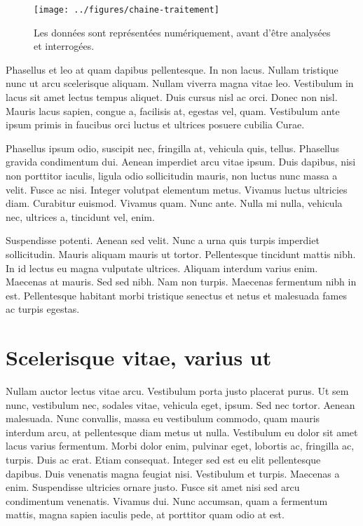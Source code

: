 \documentclass[../hdr.tex]{subfiles}
\begin{document}
\begin{figure}[htp]
  \centering
\texttt{[image: ../figures/chaine-traitement]}
  \caption[Les données sont représentées numériquement, avant d'être analysées
  et interrogées]{Les données sont représentées numériquement, avant d'être analysées
  et interrogées\footnotemark.}
  \label{chaine-traitement1}
\end{figure}


Phasellus et leo at quam dapibus pellentesque. In non lacus. Nullam tristique
nunc ut arcu scelerisque aliquam. Nullam viverra magna vitae leo. Vestibulum in
lacus sit amet lectus tempus aliquet. Duis cursus nisl ac orci. Donec non nisl.
Mauris lacus sapien, congue a, facilisis at, egestas vel, quam. Vestibulum ante
ipsum primis in faucibus orci luctus et ultrices posuere cubilia Curae.

Phasellus ipsum odio, suscipit nec, fringilla at, vehicula quis, tellus.
Phasellus gravida condimentum dui. Aenean imperdiet arcu vitae ipsum. Duis
dapibus, nisi non porttitor iaculis, ligula odio sollicitudin mauris, non luctus
nunc massa a velit. Fusce ac nisi. Integer volutpat elementum metus. Vivamus
luctus ultricies diam. Curabitur euismod. Vivamus quam. Nunc ante. Nulla mi
nulla, vehicula nec, ultrices a, tincidunt vel, enim.

Suspendisse potenti. Aenean sed velit. Nunc a urna quis turpis imperdiet
sollicitudin. Mauris aliquam mauris ut tortor. Pellentesque tincidunt mattis
nibh. In id lectus eu magna vulputate ultrices. Aliquam interdum varius enim.
Maecenas at mauris. Sed sed nibh. Nam non turpis. Maecenas fermentum nibh in
est. Pellentesque habitant morbi tristique senectus et netus et malesuada fames
ac turpis egestas.

\section{Scelerisque vitae, varius ut}

Nullam auctor lectus vitae arcu. Vestibulum porta justo placerat purus.
Ut sem nunc, vestibulum nec, sodales vitae, vehicula eget, ipsum. Sed nec
tortor. Aenean malesuada. Nunc convallis, massa eu vestibulum commodo, quam
mauris interdum arcu, at pellentesque diam metus ut nulla. Vestibulum eu dolor
sit amet lacus varius fermentum. Morbi dolor enim, pulvinar eget, lobortis ac,
fringilla ac, turpis. Duis ac erat. Etiam consequat. Integer sed est eu elit
pellentesque dapibus. Duis venenatis magna feugiat nisi. Vestibulum et turpis.
Maecenas a enim. Suspendisse ultricies ornare justo. Fusce sit amet nisi sed
arcu condimentum venenatis. Vivamus dui. Nunc accumsan, quam a fermentum mattis,
magna sapien iaculis pede, at porttitor quam odio at est.
\end{document}
